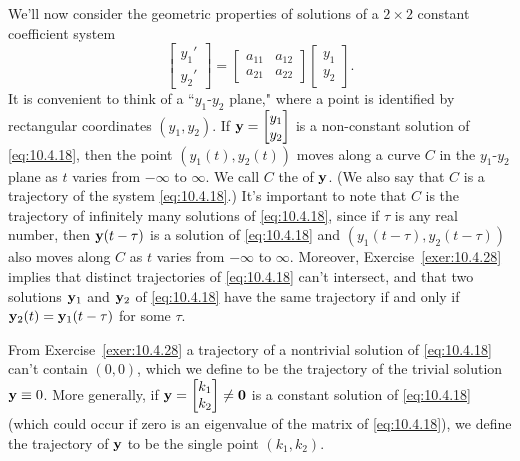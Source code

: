 \documentclass{ximera}
\begin{document}
We'll now  consider the geometric properties of solutions of a
$2\times2$ constant coefficient system
\begin{equation} \label{eq:10.4.18}
\begin{bmatrix}y_1'\\y_2'\end{bmatrix}=\begin{bmatrix}a_{11}&a_{12}\\a_{21}&a_{22}
\end{bmatrix}\begin{bmatrix}y_1\\y_2\end{bmatrix}.
\end{equation}
It is convenient to think of a ``$y_1$-$y_2$ plane," where a point
is identified by rectangular coordinates $(y_1,y_2)$. If ${\bf
y}=\begin{bmatrix}y_1\\y_2\end{bmatrix}$ is a non-constant solution of \eqref{eq:10.4.18},
then the point $(y_1(t),y_2(t))$ moves along a curve $C$ in the
$y_1$-$y_2$ plane as $t$ varies from $-\infty$ to $\infty$. We call
$C$ the  of ${\bf y}$. (We also say that $C$ is a
trajectory of the system \eqref{eq:10.4.18}.) It's important to note that
$C$ is the trajectory of infinitely many solutions of \eqref{eq:10.4.18},
since if $\tau$ is any real number, then ${\bf y}(t-\tau)$ is a
solution of \eqref{eq:10.4.18} %
and
$(y_1(t-\tau),y_2(t-\tau))$ also moves along $C$ as $t$ varies from
$-\infty$ to $\infty$. Moreover, Exercise~\ref{exer:10.4.28}%
implies
that distinct trajectories of \eqref{eq:10.4.18} can't intersect, and that
two solutions ${\bf y}_1$ and ${\bf y}_2$ of \eqref{eq:10.4.18} have the
same trajectory if and only if ${\bf y}_2(t)={\bf y}_1(t-\tau)$ for
some $\tau$.

From Exercise~\ref{exer:10.4.28}%
a trajectory of a nontrivial
solution
of \eqref{eq:10.4.18} can't contain $(0,0)$, which we define to be the
trajectory of the trivial solution ${\bf y}\equiv0$. More generally,
if ${\bf y}=\begin{bmatrix}k_1\\k_2\end{bmatrix}\neq{\bf 0}$ is a constant solution
of \eqref{eq:10.4.18} (which could occur if zero is an eigenvalue of the
matrix of \eqref{eq:10.4.18}), we define the trajectory of ${\bf y}$ to be
the single point $(k_1,k_2)$.
\end{document}
